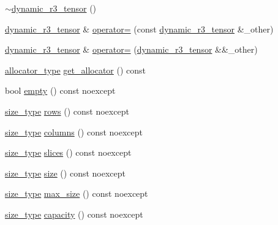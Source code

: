 \begin{DoxyCompactItemize}
\item 
\hyperlink{classcrsc_1_1dynamic__r3__tensor_a90a6788f788aaf6f479c4d5d955acce0}{$\sim$dynamic\+\_\+r3\+\_\+tensor} ()
\item 
\hyperlink{classcrsc_1_1dynamic__r3__tensor}{dynamic\+\_\+r3\+\_\+tensor} \& \hyperlink{classcrsc_1_1dynamic__r3__tensor_ab7255ecc143ab355c7464231e3e56d04}{operator=} (const \hyperlink{classcrsc_1_1dynamic__r3__tensor}{dynamic\+\_\+r3\+\_\+tensor} \&\+\_\+other)
\item 
\hyperlink{classcrsc_1_1dynamic__r3__tensor}{dynamic\+\_\+r3\+\_\+tensor} \& \hyperlink{classcrsc_1_1dynamic__r3__tensor_ab32784a3049fb1e5909c92e19dad3c11}{operator=} (\hyperlink{classcrsc_1_1dynamic__r3__tensor}{dynamic\+\_\+r3\+\_\+tensor} \&\&\+\_\+other)
\item 
\hyperlink{classcrsc_1_1dynamic__r3__tensor_af537557b80397a63ad30f77ba9660a22}{allocator\+\_\+type} \hyperlink{classcrsc_1_1dynamic__r3__tensor_a8a15e99b057b7a119b47f19f9c773444}{get\+\_\+allocator} () const 
\item 
bool \hyperlink{classcrsc_1_1dynamic__r3__tensor_a129043c92dcadc6ad7e9e1870ee9416e}{empty} () const  noexcept
\item 
\hyperlink{classcrsc_1_1dynamic__r3__tensor_a00e5f1f46f16d0c0ac1cffa6bd0fe862}{size\+\_\+type} \hyperlink{classcrsc_1_1dynamic__r3__tensor_a725899b901fbf068b9de6fdff39f4830}{rows} () const  noexcept
\item 
\hyperlink{classcrsc_1_1dynamic__r3__tensor_a00e5f1f46f16d0c0ac1cffa6bd0fe862}{size\+\_\+type} \hyperlink{classcrsc_1_1dynamic__r3__tensor_a05db472dff92a071625f29d987311d5e}{columns} () const  noexcept
\item 
\hyperlink{classcrsc_1_1dynamic__r3__tensor_a00e5f1f46f16d0c0ac1cffa6bd0fe862}{size\+\_\+type} \hyperlink{classcrsc_1_1dynamic__r3__tensor_af148a6120d1ec2684a111d6e85214a79}{slices} () const  noexcept
\item 
\hyperlink{classcrsc_1_1dynamic__r3__tensor_a00e5f1f46f16d0c0ac1cffa6bd0fe862}{size\+\_\+type} \hyperlink{classcrsc_1_1dynamic__r3__tensor_af59ca4957812b16900a78b87ce5c1194}{size} () const  noexcept
\item 
\hyperlink{classcrsc_1_1dynamic__r3__tensor_a00e5f1f46f16d0c0ac1cffa6bd0fe862}{size\+\_\+type} \hyperlink{classcrsc_1_1dynamic__r3__tensor_a973fb19ec873d899591e6d3833164468}{max\+\_\+size} () const  noexcept
\item 
\hyperlink{classcrsc_1_1dynamic__r3__tensor_a00e5f1f46f16d0c0ac1cffa6bd0fe862}{size\+\_\+type} \hyperlink{classcrsc_1_1dynamic__r3__tensor_a09c2151057626ff10816e55919a39029}{capacity} () const  noexcept

\end{DoxyCompactItemize}
